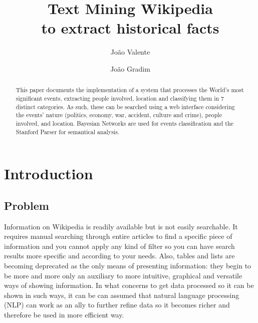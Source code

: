\documentclass{llncs}
\begin{document}
\mainmatter              %
%
\title{Text Mining Wikipedia\\to extract historical facts}
%
%
\author{João Valente \and João Gradim}
%
%
%

\maketitle              %

\begin{abstract}
This paper documents the implementation of a system that processes the World's most significant events, extracting people involved, location and classifying them in 7 distinct categories. As such, these can be searched using a web interface considering the events' nature (politics, economy, war, accident, culture and crime), people involved, and location. Bayesian Networks are used for events classification and the Stanford Parser for semantical analysis.
\end{abstract}

\section{Introduction}

\subsection{Problem}

Information on Wikipedia is readily available but is not easily searchable. It requires manual searching through entire articles to find a specific piece of information and you cannot apply any kind of filter so you can have search results more specific and according to your needs. Also, tables and lists are becoming deprecated as the only means of presenting information: they begin to be more and more only an auxiliary to more intuitive, graphical and versatile ways of showing information. In what concerns to get data processed so it can be shown in such ways, it can be can assumed that natural language processing (NLP) can work as an ally to further refine data so it becomes richer and therefore be used in more efficient way.\\
\end{document}
